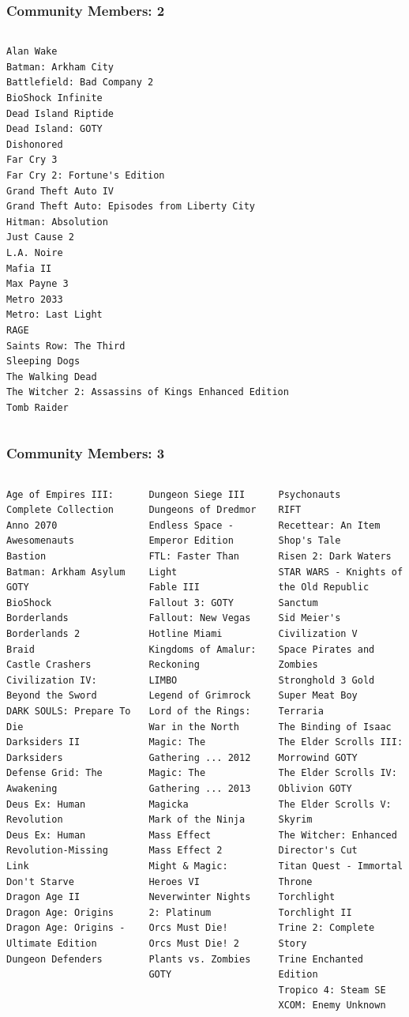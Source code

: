 \documentclass[18pt,xcolor=table]{beamer} \usefonttheme[onlymath]{serif}
\begin{document}
\begin{frame}[fragile]
  \frametitle{Community Members: 2}
  \centering
{\tiny
\begin{columns}[T]
\begin{lstlisting}
Alan Wake
Batman: Arkham City
Battlefield: Bad Company 2
BioShock Infinite
Dead Island Riptide
Dead Island: GOTY
Dishonored
Far Cry 3
Far Cry 2: Fortune's Edition
Grand Theft Auto IV
Grand Theft Auto: Episodes from Liberty City
Hitman: Absolution
Just Cause 2
L.A. Noire
Mafia II
Max Payne 3
Metro 2033
Metro: Last Light
RAGE
Saints Row: The Third
Sleeping Dogs
The Walking Dead
The Witcher 2: Assassins of Kings Enhanced Edition
Tomb Raider
\end{lstlisting}
\end{columns}
} %
\end{frame}

\begin{frame}[fragile]
  \frametitle{Community Members: 3}
  \centering
{\fontsize{5}{4}\selectfont
\begin{columns}[T]
\begin{lstlisting}
Age of Empires III: Complete Collection
Anno 2070
Awesomenauts
Bastion
Batman: Arkham Asylum GOTY
BioShock
Borderlands
Borderlands 2
Braid
Castle Crashers
Civilization IV: Beyond the Sword
DARK SOULS: Prepare To Die
Darksiders II
Darksiders
Defense Grid: The Awakening
Deus Ex: Human Revolution
Deus Ex: Human Revolution-Missing Link
Don't Starve
Dragon Age II
Dragon Age: Origins
Dragon Age: Origins - Ultimate Edition
Dungeon Defenders
\end{lstlisting}
\begin{lstlisting}
Dungeon Siege III
Dungeons of Dredmor
Endless Space - Emperor Edition
FTL: Faster Than Light
Fable III
Fallout 3: GOTY
Fallout: New Vegas
Hotline Miami
Kingdoms of Amalur: Reckoning
LIMBO
Legend of Grimrock
Lord of the Rings: War in the North
Magic: The Gathering ... 2012
Magic: The Gathering ... 2013
Magicka
Mark of the Ninja
Mass Effect
Mass Effect 2
Might & Magic: Heroes VI
Neverwinter Nights 2: Platinum
Orcs Must Die!
Orcs Must Die! 2
Plants vs. Zombies GOTY
\end{lstlisting}
\begin{lstlisting}
Psychonauts
RIFT
Recettear: An Item Shop's Tale
Risen 2: Dark Waters
STAR WARS - Knights of the Old Republic
Sanctum
Sid Meier's Civilization V
Space Pirates and Zombies
Stronghold 3 Gold
Super Meat Boy
Terraria
The Binding of Isaac
The Elder Scrolls III: Morrowind GOTY
The Elder Scrolls IV: Oblivion GOTY
The Elder Scrolls V: Skyrim
The Witcher: Enhanced Director's Cut
Titan Quest - Immortal Throne
Torchlight
Torchlight II
Trine 2: Complete Story
Trine Enchanted Edition
Tropico 4: Steam SE
XCOM: Enemy Unknown
\end{lstlisting}
\end{columns}
} %
\end{frame}
\end{document}
